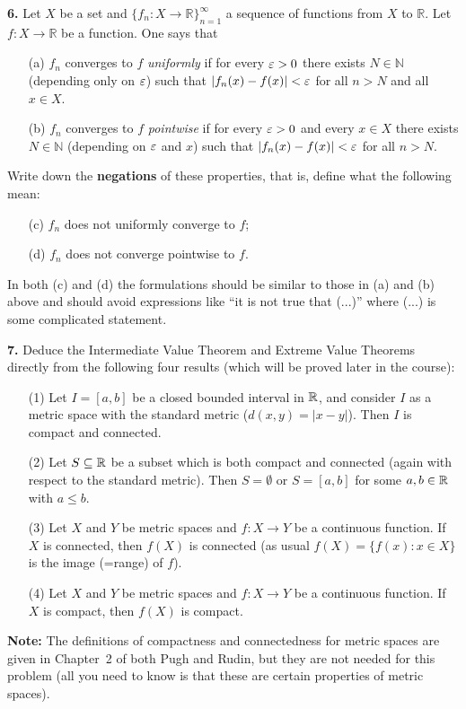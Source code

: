 \documentclass[11pt]{amsart}
\begin{document}
\skv
{\bf 6.} Let $X$ be a set and $\{f_n:X\to\mathbb R\}_{n=1}^{\infty}$ a sequence of functions from $X$ to $\mathbb R$. Let $f:X\to\mathbb R$
be a function.
One says that
\begin{itemize}
\item[(a)] $f_n$ converges to $f$ {\it uniformly} if for every ${\varepsilon}>0$ there exists $N\in\mathbb N$ (depending only on ${\varepsilon}$) such that $|f_n(x)-f(x)|<{\varepsilon}$
for all $n>N$ and all $x\in X$.
\item[(b)] $f_n$ converges to $f$ {\it pointwise} if for every ${\varepsilon}>0$ and every $x\in X$ there exists $N\in\mathbb N$ (depending on ${\varepsilon}$ and $x$) such that $|f_n(x)-f(x)|<{\varepsilon}$ for all $n>N$.
\end{itemize}
Write down the {\bf negations} of these properties, that is, define what the following mean:
\begin{itemize}
\item[(c)] $f_n$ does not uniformly converge to $f$; 
\item[(d)] $f_n$ does not converge pointwise to $f$.
\end{itemize}
\skv
In both (c) and (d) the formulations should be similar to those in (a) and (b) above and should avoid expressions like ``it is not true that (...)''
where (...) is some complicated statement.
\skv

{\bf 7.} Deduce the Intermediate Value Theorem and Extreme Value Theorems directly from the following four results
(which will be proved later in the course):
\begin{itemize}
\item[(1)] Let $I=[a,b]$ be a closed bounded interval in ${\mathbb R}$, and consider $I$ as a metric space with the standard metric
($d(x,y)=|x-y|$). Then $I$ is compact and connected.
\item[(2)] Let $S\subseteq {\mathbb R}$ be a subset which is both compact and connected (again with respect to the standard metric).
Then $S=\emptyset$ or $S=[a,b]$ for some $a,b\in{\mathbb R}$ with $a\leq b$.
\item[(3)] Let $X$ and $Y$ be metric spaces and $f:X\to Y$ be a continuous function. If $X$ is connected, then $f(X)$ is connected (as usual $f(X)=\{f(x): x\in X\}$ is the image (=range) of $f$).
\item[(4)] Let $X$ and $Y$ be metric spaces and $f:X\to Y$ be a continuous function. If $X$ is compact, then $f(X)$ is compact.
\end{itemize}
{\bf Note:} The definitions of compactness and connectedness for metric spaces are given in Chapter~2 of both Pugh and Rudin, but they are not needed for this problem (all you need to know is that these are certain properties of metric spaces).
\end{document}
